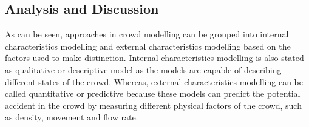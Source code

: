 \subsection{Analysis and Discussion}

As can be seen, approaches in crowd modelling can be grouped into internal characteristics modelling and external characteristics modelling based on the factors used to make distinction. Internal characteristics modelling is also stated as qualitative or descriptive model \citep{Petty2004} as the models are capable of describing different states of the crowd. Whereas, external characteristics modelling can be called quantitative or predictive because these models can predict the potential accident in the crowd by measuring different physical factors of the crowd, such as density, movement and flow rate.

